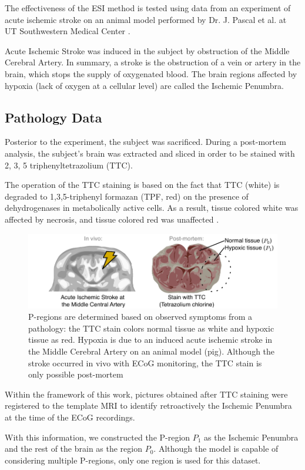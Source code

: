 The effectiveness of the ESI method is tested using data from an experiment of acute ischemic stroke on an animal model performed by Dr. J. Pascal et al. at UT Southwestern Medical Center \cite{pig_lesion1, PMID_36109613}.

Acute Ischemic Stroke was induced in the subject by obstruction of the Middle Cerebral Artery.
%
In summary, a stroke is the obstruction of a vein or artery in the brain, which stops the supply of oxygenated blood.
%
The brain regions affected by hypoxia (lack of oxygen at a cellular level) are called the Ischemic Penumbra.

\subsection{Pathology Data}

Posterior to the experiment, the subject was sacrificed.
%
During a post-mortem analysis, the subject's brain was extracted and sliced in order to be stained with 
2, 3, 5 triphenyltetrazolium (TTC).

The operation of the TTC staining is based on the fact that TTC (white) 
is degraded to 1,3,5-triphenyl formazan (TPF, red)
on the presence of dehydrogenases in metabolically active cells.
%
As a result, tissue colored white was affected by necrosis, and tissue colored red was unaffected \cite{li2018use}. 

\begin{figure}
\centering
\includegraphics[width=\linewidth]{./img/Pregions_real.pdf}
\caption{P-regions are determined based on observed symptoms from a pathology: the TTC stain colors normal tissue as white and hypoxic tissue as red.
%
Hypoxia is due to an induced acute ischemic stroke in the Middle Cerebral Artery on an animal model (pig).
%
Although the stroke occurred in vivo with ECoG monitoring, the TTC stain is only possible post-mortem}
\end{figure}

Within the framework of this work, pictures obtained after TTC staining were registered to the template MRI to identify retroactively the Ischemic Penumbra at the time of the ECoG recordings.
%

With this information, we constructed the P-region $P_1$ as the Ischemic Penumbra and the rest of the brain as the region $P_0$.
%
%
Although the model is capable of considering multiple P-regions, only one region is used for this dataset.
